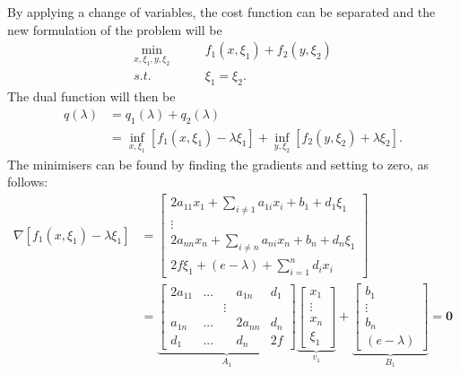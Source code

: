 \documentclass[12pt]{article}
\begin{document}
By applying a change of variables, the cost function can be separated and the new formulation of the problem will be
\begin{align*}
\min_{x,\xi_1,y,\xi_2}\qquad& f_1(x,\xi_1)+f_2(y,\xi_2)\\
s.t.\qquad&\xi_1=\xi_2.
\end{align*}
The dual function will then be
\begin{align*}
q(\lambda)&=q_1(\lambda)+q_2(\lambda)\\
&=\inf_{x,\xi_1}[f_1(x,\xi_1)-\lambda\xi_1]+\inf_{y,\xi_2}[f_2(y,\xi_2)+\lambda\xi_2].
\end{align*}
The minimisers can be found by finding the gradients and setting to zero, as follows:
\begin{align*}
\nabla [f_1(x,\xi_1)-\lambda\xi_1]&=\begin{bmatrix}2a_{11}x_1+\sum\limits_{i\neq1} a_{1i}x_i+b_1+d_1\xi_1\\ \vdots\\ 2a_{nn}x_n+\sum\limits_{i\neq n} a_{ni}x_n+b_n+d_n\xi_1\\2f\xi_1+(e-\lambda)+\sum\limits_{i=1}^n d_ix_i\end{bmatrix}\\
&=\underbrace{\begin{bmatrix}2a_{11}&...&&a_{1n}&d_1\\&& \vdots\\ a_{1n}&...&&2a_{nn}&d_n\\d_1&...&&d_n&2f\end{bmatrix}}_{A_1} \underbrace{\begin{bmatrix}x_1\\ \vdots\\ x_n\\\xi_1\end{bmatrix}}_{v_1}+\underbrace{\begin{bmatrix}b_1\\ \vdots\\ b_n\\(e-\lambda)\end{bmatrix}}_{B_1}=\textbf{0}
\end{align*}
\end{document}
